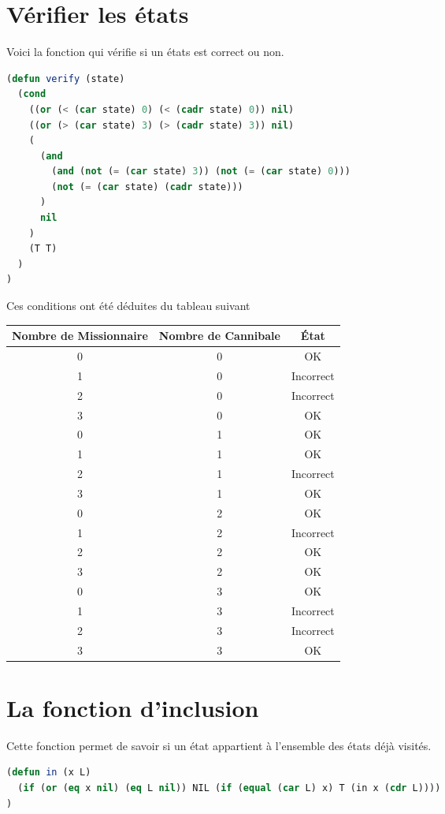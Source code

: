 \documentclass[a4paper, 12pt, leqno]{report}
\theoremstyle{plain}
\begin{document}
            \section{Vérifier les états}
            Voici la fonction qui vérifie si un états est correct ou non.  
             \begin{lstlisting}[label=some-code,caption=verify (state) ,language=lisp]
(defun verify (state)
  (cond
    ((or (< (car state) 0) (< (cadr state) 0)) nil)
    ((or (> (car state) 3) (> (cadr state) 3)) nil)
    (
      (and 
        (and (not (= (car state) 3)) (not (= (car state) 0)))
        (not (= (car state) (cadr state)))
      )
      nil
    )
    (T T)
  )	
)
            \end{lstlisting} 
            \newpage
            Ces conditions ont été déduites du tableau suivant 
            \begin{center}
            \begin{tabular}{|c|c|c|}
            \hline
            Nombre de Missionnaire & Nombre de Cannibale & État\\ \hline
            0&0&OK\\ \hline 1&0&Incorrect\\ \hline 2&0&Incorrect\\ \hline 3&0&OK\\ \hline
            0&1&OK\\ \hline 1&1&OK\\ \hline 2&1&Incorrect\\ \hline 3&1&OK\\ \hline
            0&2&OK\\ \hline 1&2&Incorrect\\ \hline 2&2&OK\\ \hline 3&2&OK\\ \hline
            0&3&OK\\ \hline 1&3&Incorrect\\ \hline 2&3&Incorrect\\ \hline 3&3&OK\\
            \hline
            \end{tabular}
               \end{center}
               
            \section{La fonction d'inclusion}
            Cette fonction permet de savoir si un état appartient à l'ensemble des états déjà visités.
             \begin{lstlisting}[label=some-code,caption=in (x L) version récursive ,language=lisp]
(defun in (x L)
  (if (or (eq x nil) (eq L nil)) NIL (if (equal (car L) x) T (in x (cdr L))))
)
            \end{lstlisting} 
\end{document}
